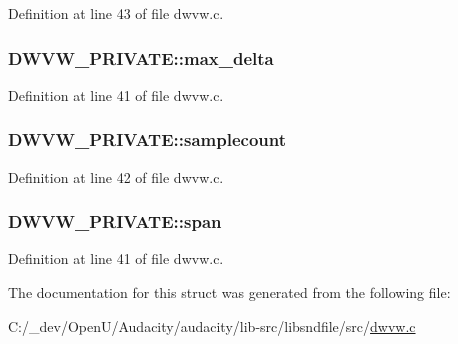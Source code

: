 Definition at line 43 of file dwvw.\+c.

\subsubsection[{\texorpdfstring{max\+\_\+delta}{max_delta}}]{ D\+W\+V\+W\+\_\+\+P\+R\+I\+V\+A\+T\+E\+::max\+\_\+delta}\hypertarget{struct_d_w_v_w___p_r_i_v_a_t_e_a69752e0dacba092d81a8eb9aaa084361}{}\label{struct_d_w_v_w___p_r_i_v_a_t_e_a69752e0dacba092d81a8eb9aaa084361}


Definition at line 41 of file dwvw.\+c.

\subsubsection[{\texorpdfstring{samplecount}{samplecount}}]{ D\+W\+V\+W\+\_\+\+P\+R\+I\+V\+A\+T\+E\+::samplecount}\hypertarget{struct_d_w_v_w___p_r_i_v_a_t_e_af865bfccc1821f21159c948656869b32}{}\label{struct_d_w_v_w___p_r_i_v_a_t_e_af865bfccc1821f21159c948656869b32}


Definition at line 42 of file dwvw.\+c.

\subsubsection[{\texorpdfstring{span}{span}}]{ D\+W\+V\+W\+\_\+\+P\+R\+I\+V\+A\+T\+E\+::span}\hypertarget{struct_d_w_v_w___p_r_i_v_a_t_e_a23a7fbd234b70e868f1f0708671d2dc5}{}\label{struct_d_w_v_w___p_r_i_v_a_t_e_a23a7fbd234b70e868f1f0708671d2dc5}


Definition at line 41 of file dwvw.\+c.



The documentation for this struct was generated from the following file\+:\begin{DoxyCompactItemize}
\item 
C\+:/\+\_\+dev/\+Open\+U/\+Audacity/audacity/lib-\/src/libsndfile/src/\hyperlink{dwvw_8c}{dwvw.\+c}\end{DoxyCompactItemize}
